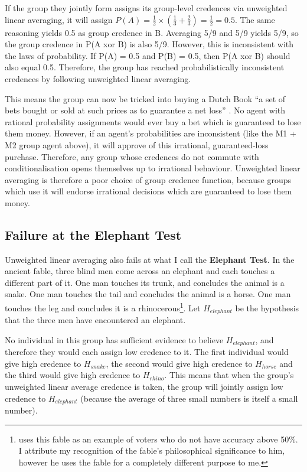 \documentclass{article}
\begin{document}
If the group they jointly form assigns its group-level credences via unweighted linear averaging, it will assign \(P(A) = \frac{1}{2} \times (\frac{1}{3} + \frac{2}{3}) = \frac{1}{2} = 0.5\). The same reasoning yields 0.5 as group credence in B. Averaging 5/9 and 5/9 yields 5/9, so the group credence in P(A xor B) is also 5/9. However, this is inconsistent with the laws of probability. If P(A) = 0.5 and P(B) = 0.5, then P(A xor B) should also equal 0.5. Therefore, the group has reached probabilistically inconsistent credences by following unweighted linear averaging. 

This means the group can now be tricked into buying a Dutch Book \textemdash{} ``a set of bets bought or sold at such prices as to guarantee a net loss'' \citep{hajek2008dutch}. No agent with rational probability assignments would ever buy a bet which is guaranteed to lose them money. However, if an agent's probabilities are inconsistent (like the M1 + M2 group agent above), it will approve of this irrational, guaranteed-loss purchase. Therefore, any group whose credences do not commute with conditionalisation opens themselves up to irrational behaviour. Unweighted linear averaging is therefore a poor choice of group credence function, because groups which use it will endorse irrational decisions which are guaranteed to lose them money.

\subsection{Failure at the Elephant Test}

Unweighted linear averaging also fails at what I call the \textbf{Elephant Test}. In the ancient fable, three blind men come across an elephant and each touches a different part of it. One man touches its trunk, and concludes the animal is a snake. One man touches the tail and concludes the animal is a horse. One man touches the leg and concludes it is a rhinocerous\footnote{\citet[pg. 229]{estlund2009democratic} uses this fable as an example of voters who do not have accuracy above 50\%. I attribute my recognition of the fable's philosophical significance to him, however he uses the fable for a completely different purpose to me.}. Let \(H_{elephant}\) be the hypothesis that the three men have encountered an elephant. 

No individual in this group has sufficient evidence to believe \(H_{elephant}\), and therefore they would each assign low credence to it. The first individual would give high credence to \(H_{snake}\), the second would give high credence to \(H_{horse}\) and the third would give high credence to \(H_{rhino}\). This means that when the group's unweighted linear average credence is taken, the group will jointly assign low credence to \(H_{elephant}\) (because the average of three small numbers is itself a small number). 
\end{document}
